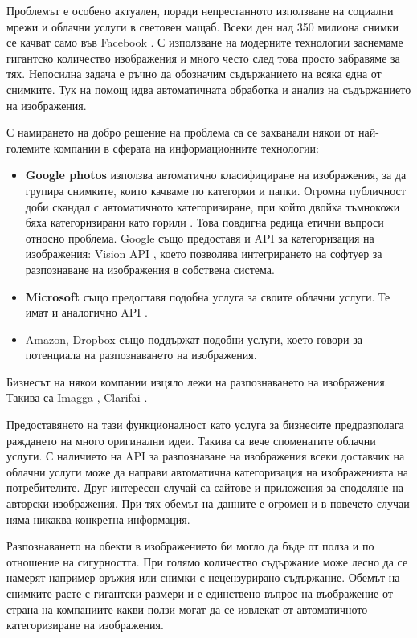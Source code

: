 Проблемът е особено актуален, поради непрестанното използване на социални мрежи и облачни услуги в световен мащаб. Всеки ден над 350 милиона снимки се качват само във Facebook \cite{FacebookFacts}. С използване на модерните технологии заснемаме гигантско количество изображения и много често след това просто забравяме за тях. Непосилна задача е ръчно да обозначим съдържанието на всяка една от снимките. Тук на помощ идва автоматичната обработка и анализ на съдържанието на изображения.

С намирането на добро решение на проблема са се захванали някои от най-големите компании в сферата на информационните технологии:

\begin{itemize}
\item \textbf{Google photos} \cite{GooglePhotos} използва автоматично класифициране на изображения, за да групира снимките, които качваме по категории и папки. Огромна публичност доби скандал с автоматичното категоризиране, при който двойка тъмнокожи бяха категоризирани като горили \cite{GoogleGorillas}. Това повдигна редица етични въпроси относно проблема. Google също предоставя и API за категоризация на изображения: Vision API \cite{GoogleVisionAPI}, което позволява интегрирането на софтуер за разпознаване на изображения в собствена система.
\item \textbf{Microsoft} също предоставя подобна услуга за своите облачни услуги. Те имат и аналогично API \cite{MicrosoftVisionAPI}.
\item Amazon, Dropbox също поддържат подобни услуги, което говори за потенциала на разпознаването на изображения.
\end{itemize}

Бизнесът на някои компании изцяло лежи на разпознаването на изображения. Такива са Imagga \cite{Imagga}, Clarifai \cite{Clarifai}.

Предоставянето на тази функционалност като услуга за бизнесите предразполага раждането на много оригинални идеи. Такива са вече споменатите облачни услуги. С наличието на API за разпознаване на изображения всеки доставчик на облачни услуги може да направи автоматична категоризация на изображенията на потребителите. Друг интересен случай са сайтове и приложения за споделяне на авторски изображения. При тях обемът на данните е огромен и в повечето случаи няма никаква конкретна информация.

Разпознаването на обекти в изображението би могло да бъде от полза и по отношение на сигурността. При голямо количество съдържание може лесно да се намерят например оръжия или снимки с нецензурирано съдържание. Обемът на снимките расте с гигантски размери и е единствено въпрос на въображение от страна на компаниите какви ползи могат да се извлекат от автоматичното категоризиране на изображения.

